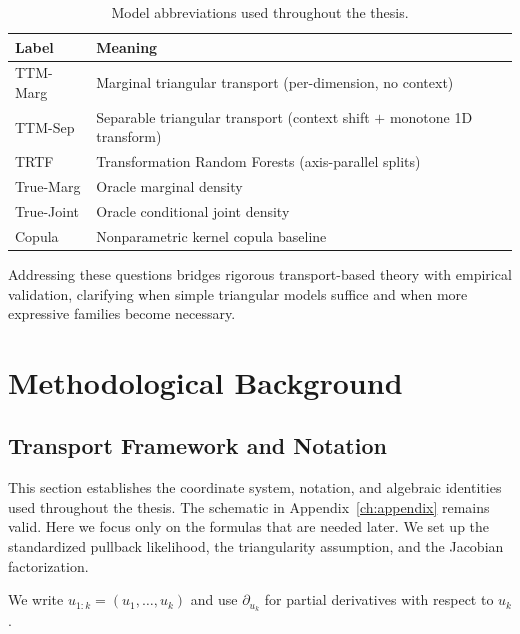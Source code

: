 \documentclass[11pt,a4paper,twoside]{book}\usepackage[]{graphicx}\usepackage[]{xcolor}
\begin{document}
\begin{table}[t]
  \centering
  \caption{Model abbreviations used throughout the thesis.}
  \label{tab:model-abbrev}
  \begin{tabular}{ll}
    \hline
    Label & Meaning \\
    \hline
    TTM-Marg  & Marginal triangular transport (per-dimension, no context) \\
    TTM-Sep   & Separable triangular transport (context shift $+$ monotone 1D transform) \\
    TRTF      & Transformation Random Forests (axis-parallel splits) \\
    True-Marg & Oracle marginal density \\
    True-Joint& Oracle conditional joint density \\
    Copula    & Nonparametric kernel copula baseline \\
    \hline
  \end{tabular}
\end{table}

Addressing these questions bridges rigorous transport-based theory with empirical validation, clarifying when simple triangular models suffice and when more expressive families become necessary.






\chapter{Methodological Background}\label{ch:background}

\section{Transport Framework and Notation}\label{sec:transport-frame}

This section establishes the coordinate system, notation, and algebraic identities used throughout the thesis. The schematic in Appendix~\ref{ch:appendix} remains valid. Here we focus only on the formulas that are needed later. We set up the standardized pullback likelihood, the triangularity assumption, and the Jacobian factorization.

We write $u_{1:k}=(u_1,\ldots,u_k)$ and use $\partial_{u_k}$ for partial derivatives with respect to $u_k$.
\end{document}
